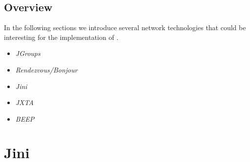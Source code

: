 \documentclass[11pt,a4paper]{article}
\begin{document}
\subsection{Overview}
In the following sections we introduce several network technologies that could be interesting for the implementation of \ace. 

\begin{itemize}
 \item \emph{JGroups}
 \item \emph{Rendezvous/Bonjour}
 \item \emph{Jini}
 \item \emph{JXTA}
 \item \emph{BEEP}
\end{itemize}






\section{Jini}




\end{document}

